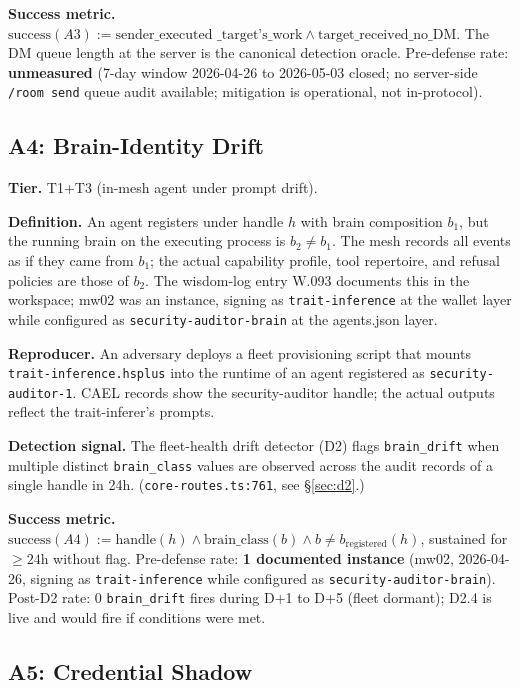 \documentclass[letterpaper,twocolumn,10pt]{article}
\begin{document}
\textbf{Success metric.} $\text{success}(A3) := \text{sender\_executed
\_target's\_work} \wedge \text{target\_received\_no\_DM}$. The DM
queue length at the server is the canonical detection oracle.
Pre-defense rate: \textbf{unmeasured} (7-day window 2026-04-26 to
2026-05-03 closed; no server-side \texttt{/room send} queue audit
available; mitigation is operational, not in-protocol).

\subsection{A4: Brain-Identity Drift}
\label{sec:a4}

\textbf{Tier.} T1+T3 (in-mesh agent under prompt drift).

\textbf{Definition.} An agent registers under handle $h$ with brain
composition $b_1$, but the running brain on the executing process is
$b_2 \neq b_1$. The mesh records all events as if they came from
$b_1$; the actual capability profile, tool repertoire, and refusal
policies are those of $b_2$. The wisdom-log entry W.093 documents
this in the workspace; mw02 was an instance, signing as
\texttt{trait-inference} at the wallet layer while configured as
\texttt{security-auditor-brain} at the agents.json layer.

\textbf{Reproducer.} An adversary deploys a fleet provisioning
script that mounts \texttt{trait-inference.hsplus} into the runtime
of an agent registered as \texttt{security-auditor-1}. CAEL records
show the security-auditor handle; the actual outputs reflect the
trait-inferer's prompts.

\textbf{Detection signal.} The fleet-health drift detector (D2)
flags \texttt{brain\_drift} when multiple distinct \texttt{brain\_class}
values are observed across the audit records of a single handle in
24h. (\texttt{core-routes.ts:761}, see \S\ref{sec:d2}.)

\textbf{Success metric.} $\text{success}(A4) := \text{handle}(h) \wedge
\text{brain\_class}(b) \wedge b \neq b_{\text{registered}}(h)$,
sustained for $\geq 24\text{h}$ without flag.
Pre-defense rate: \textbf{1 documented instance} (mw02,
2026-04-26, signing as \texttt{trait-inference} while configured as
\texttt{security-auditor-brain}). Post-D2 rate: 0 \texttt{brain\_drift}
fires during D+1 to D+5 (fleet dormant); D2.4 is live and would fire if
conditions were met.

\subsection{A5: Credential Shadow}
\label{sec:a5}
\end{document}
